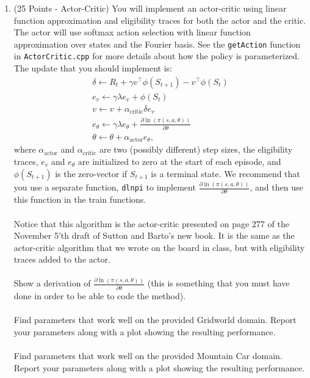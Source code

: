 \documentclass{article}
\begin{document}
\begin{enumerate}
    \item (25 Points - Actor-Critic) You will implement an actor-critic using linear function approximation and eligibility traces for both the actor and the critic. The actor will use softmax action selection with linear function approximation over states and the Fourier basis. See the \texttt{getAction} function in \texttt{ActorCritic.cpp} for more details about how the policy is parameterized. The update that you should implement is:
    \begin{gather}
        \delta \gets R_t + \gamma v^\intercal \phi(S_{t+1})-v^\intercal \phi(S_t)
        \\
        e_v \gets \gamma \lambda e_v + \phi(S_t)
        \\
        v \gets v + \alpha_{\text{critic}}\delta e_v
        \\
        e_\theta \gets \gamma \lambda e_\theta + \frac{\partial \ln( \pi(s,a,\theta))}{\partial \theta}
        \\
        \theta \gets \theta + \alpha_\text{actor}e_\theta,
    \end{gather}
    where $\alpha_\text{actor}$ and $\alpha_\text{critic}$ are two (possibly different) step sizes, the eligibility traces, $e_v$ and $e_\theta$ are initialized to zero at the start of each episode, and $\phi(S_{t+1})$ is the zero-vector if $S_{t+1}$ is a terminal state. We recommend that you use a separate function, \texttt{dlnpi} to implement $\frac{\partial \ln(\pi(s,a,\theta))}{\partial \theta}$, and then use this function in the train functions. 
    \\\\
    Notice that this algorithm is the actor-critic presented on page 277 of the November 5'th draft of Sutton and Barto's new book. It is the same as the actor-critic algorithm that we wrote on the board in class, but with eligibility traces added to the actor.
    \\\\
     Show a derivation of $\frac{\partial \ln(\pi(s,a,\theta))}{\partial \theta}$ (this is something that you must have done in order to be able to code the method).
    \\\\
     Find parameters that work well on the provided Gridworld domain. Report your parameters along with a plot showing the resulting performance.
    \\\\
     Find parameters that work well on the provided Mountain Car domain. Report your parameters along with a plot showing the resulting performance.

\end{enumerate}
\end{document}
